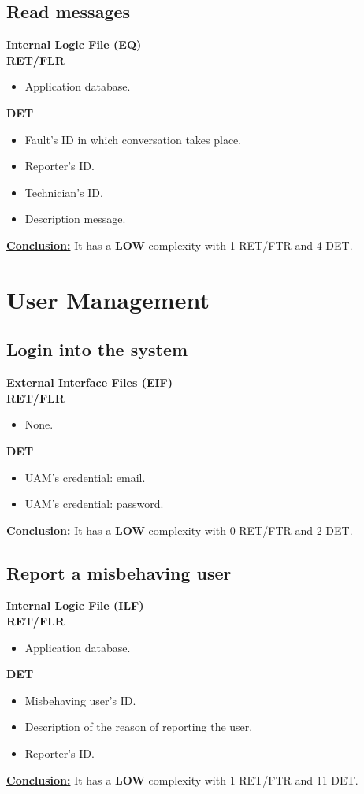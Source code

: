 \subsection{Read messages}
\textbf{Internal Logic File (EQ)} \\ 
\textbf{RET/FLR}
\begin{itemize}
\item Application database.
\end{itemize}
\textbf{DET}
\begin{itemize}
\item Fault's ID in which conversation takes place.
\item Reporter's ID.
\item Technician's ID.
\item Description message.
\end{itemize}
\textbf{\underline{Conclusion:}} It has a \textbf{LOW} complexity with 1 RET/FTR and 4 DET.



\section{User Management}

\subsection{Login into the system}
\textbf{External Interface Files (EIF)} \\ 
\textbf{RET/FLR}
\begin{itemize}
\item None.
\end{itemize}
\textbf{DET}
\begin{itemize}
\item UAM's credential: email.
\item UAM's credential: password.
\end{itemize}
\textbf{\underline{Conclusion:}} It has a \textbf{LOW} complexity with 0 RET/FTR and 2 DET.

\subsection{Report a misbehaving user}
\textbf{Internal Logic File (ILF)} \\ 
\textbf{RET/FLR}
\begin{itemize}
\item Application database.

\end{itemize}
\textbf{DET}
\begin{itemize}
\item Misbehaving user's ID.
\item Description of the reason of reporting the user.
\item Reporter's ID.

\end{itemize}
\textbf{\underline{Conclusion:}} It has a \textbf{LOW} complexity with 1 RET/FTR and 11 DET.

